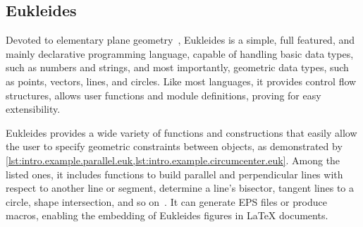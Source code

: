 \subsection{Eukleides}%
\label{sec:related.constraints.eukleides}

Devoted to elementary plane geometry~\cite{Obrecht:2010:EM}, Eukleides is a
simple, full featured, and mainly declarative programming language, capable of
handling basic data types, such as numbers and strings, and most importantly,
geometric data types, such as points, vectors, lines, and circles.  Like most
languages, it provides control flow structures, allows user functions and module
definitions, proving for easy extensibility.

Eukleides provides a wide variety of functions and constructions that easily
allow the user to specify geometric constraints between objects, as demonstrated
by \cref{lst:intro.example.parallel.euk,lst:intro.example.circumcenter.euk}.
Among the listed ones, it includes functions to build parallel and perpendicular
lines with respect to another line or segment, determine a line's bisector,
tangent lines to a circle, shape intersection, and so on~\cite{Obrecht:2010:EM}.
It can generate \ac{EPS} files or produce macros, enabling the embedding of
Eukleides figures in \LaTeX{} documents.

